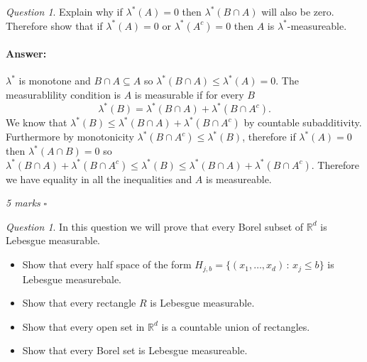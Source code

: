 \documentclass[11pt]{article}
\theoremstyle{definition}
\theoremstyle{remark}
\newtheorem{q}[thm]{Question}
\newenvironment{ans}{\paragraph{Answer:}}{\hfill$\square$}
\begin{document}
\begin{q}
Explain why if $\lambda^*(A) =0$ then $\lambda^*(B \cap A)$ will also be zero. Therefore show that if $\lambda^*(A) =0$ or $\lambda^*(A^c) =0$ then $A$ is $\lambda^*$-measureable. 
\end{q}
\begin{ans}
$\lambda^*$ is monotone and $B \cap A \subseteq A$ so $\lambda^*(B \cap A) \leq \lambda^*(A) = 0$. The measurablility condition is $A$ is measurable if for every $B$
\[ \lambda^*(B) = \lambda^*(B \cap A) + \lambda^*(B \cap A^c). \] We know that $\lambda^*(B) \leq \lambda^*(B\cap A) + \lambda^*(B \cap A^c)$ by countable subadditivity. Furthermore by monotonicity $\lambda^*(B \cap A^c) \leq \lambda^*(B)$, therefore if $\lambda^*(A) = 0$ then $\lambda^*(A\cap B) = 0$ so $\lambda^*(B \cap A) + \lambda^*(B \cap A^c) \leq \lambda^*(B) \leq \lambda^*(B \cap A) + \lambda^*(B \cap A^c)$. Therefore we have equality in all the inequalities and $A$ is measureable.

\emph{5 marks}
\end{ans}

\begin{q}
In this question we will prove that every Borel subset of $\mathbb{R}^d$ is Lebesgue measurable.
\begin{itemize}
	\item Show that every half space of the form $H_{j,b} = \{ (x_1, \dots, x_d) \,:\, x_j \leq b \}$ is Lebesgue measurebale.
	\item Show that every rectangle $R$ is Lebesgue measurable.
	\item Show that every open set in $\mathbb{R}^d$ is a countable union of rectangles.
	\item Show that every Borel set is Lebesgue measureable.
\end{itemize}
\end{q}
\end{document}
